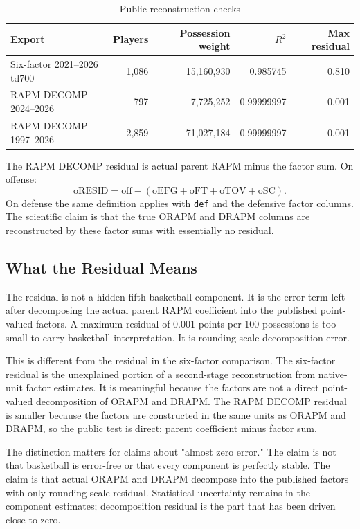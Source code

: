 \documentclass[11pt]{article}
\begin{document}
\begin{table}[h]
\centering
\caption{Public reconstruction checks}
\label{tab:exports}
\begin{tabular}{lrrrr}
\toprule
Export & Players & Possession weight & $R^2$ & Max residual\\
\midrule
Six-factor 2021--2026 td700 & 1,086 & 15,160,930 & 0.985745 & 0.810\\
RAPM DECOMP 2024--2026 & 797 & 7,725,252 & 0.99999997 & 0.001\\
RAPM DECOMP 1997--2026 & 2,859 & 71,027,184 & 0.99999997 & 0.001\\
\bottomrule
\end{tabular}
\end{table}

The RAPM DECOMP residual is actual parent RAPM minus the factor sum.  On
offense:
\[
\text{oRESID}
= \text{off}
- (\text{oEFG}+\text{oFT}+\text{oTOV}+\text{oSC}).
\]
On defense the same definition applies with \texttt{def} and the defensive
factor columns.  The scientific claim is that the true ORAPM and DRAPM columns
are reconstructed by these factor sums with essentially no residual.

\subsection{What the Residual Means}

The residual is not a hidden fifth basketball component.  It is the error term
left after decomposing the actual parent RAPM coefficient into the published
point-valued factors.  A maximum residual of 0.001 points per 100 possessions is
too small to carry basketball interpretation.  It is rounding-scale
decomposition error.

This is different from the residual in the six-factor comparison.  The
six-factor residual is the unexplained portion of a second-stage reconstruction
from native-unit factor estimates.  It is meaningful because the factors are not
a direct point-valued decomposition of ORAPM and DRAPM.  The RAPM DECOMP
residual is smaller because the factors are constructed in the same units as
ORAPM and DRAPM, so the public test is direct: parent coefficient minus factor
sum.

The distinction matters for claims about "almost zero error."  The claim is not
that basketball is error-free or that every component is perfectly stable.  The
claim is that actual ORAPM and DRAPM decompose into the published factors with
only rounding-scale residual.  Statistical uncertainty remains in the component
estimates; decomposition residual is the part that has been driven close to
zero.
\end{document}
